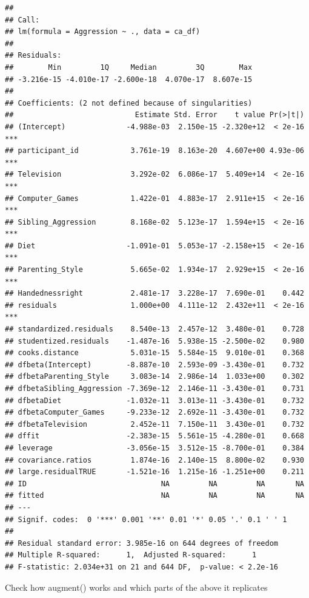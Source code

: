 \documentclass[
]{book}
\begin{document}
\begin{verbatim}
## 
## Call:
## lm(formula = Aggression ~ ., data = ca_df)
## 
## Residuals:
##        Min         1Q     Median         3Q        Max 
## -3.216e-15 -4.010e-17 -2.600e-18  4.070e-17  8.607e-15 
## 
## Coefficients: (2 not defined because of singularities)
##                            Estimate Std. Error    t value Pr(>|t|)    
## (Intercept)              -4.988e-03  2.150e-15 -2.320e+12  < 2e-16 ***
## participant_id            3.761e-19  8.163e-20  4.607e+00 4.93e-06 ***
## Television                3.292e-02  6.086e-17  5.409e+14  < 2e-16 ***
## Computer_Games            1.422e-01  4.883e-17  2.911e+15  < 2e-16 ***
## Sibling_Aggression        8.168e-02  5.123e-17  1.594e+15  < 2e-16 ***
## Diet                     -1.091e-01  5.053e-17 -2.158e+15  < 2e-16 ***
## Parenting_Style           5.665e-02  1.934e-17  2.929e+15  < 2e-16 ***
## Handednessright           2.481e-17  3.228e-17  7.690e-01    0.442    
## residuals                 1.000e+00  4.111e-12  2.432e+11  < 2e-16 ***
## standardized.residuals    8.540e-13  2.457e-12  3.480e-01    0.728    
## studentized.residuals    -1.487e-16  5.938e-15 -2.500e-02    0.980    
## cooks.distance            5.031e-15  5.584e-15  9.010e-01    0.368    
## dfbeta(Intercept)        -8.887e-10  2.593e-09 -3.430e-01    0.732    
## dfbetaParenting_Style     3.083e-14  2.986e-14  1.033e+00    0.302    
## dfbetaSibling_Aggression -7.369e-12  2.146e-11 -3.430e-01    0.731    
## dfbetaDiet               -1.032e-11  3.013e-11 -3.430e-01    0.732    
## dfbetaComputer_Games     -9.233e-12  2.692e-11 -3.430e-01    0.732    
## dfbetaTelevision          2.452e-11  7.150e-11  3.430e-01    0.732    
## dffit                    -2.383e-15  5.561e-15 -4.280e-01    0.668    
## leverage                 -3.056e-15  3.512e-15 -8.700e-01    0.384    
## covariance.ratios         1.874e-16  2.140e-15  8.800e-02    0.930    
## large.residualTRUE       -1.521e-16  1.215e-16 -1.251e+00    0.211    
## ID                               NA         NA         NA       NA    
## fitted                           NA         NA         NA       NA    
## ---
## Signif. codes:  0 '***' 0.001 '**' 0.01 '*' 0.05 '.' 0.1 ' ' 1
## 
## Residual standard error: 3.985e-16 on 644 degrees of freedom
## Multiple R-squared:      1,  Adjusted R-squared:      1 
## F-statistic: 2.034e+31 on 21 and 644 DF,  p-value: < 2.2e-16
\end{verbatim}

Check how augment() works and which parts of the above it replicates
\end{document}
